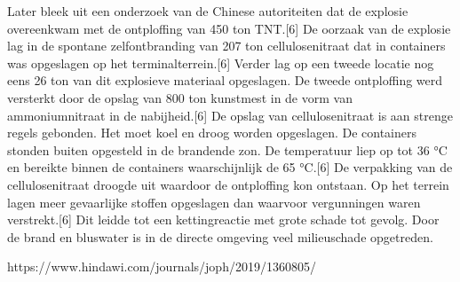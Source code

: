 {{{{{{Later bleek uit een onderzoek van de Chinese autoriteiten dat de explosie overeenkwam met de ontploffing van 450 ton TNT.[6] 
De oorzaak van de explosie lag in de spontane zelfontbranding van 207 ton cellulosenitraat dat in containers was opgeslagen op het terminalterrein.[6] 
Verder lag op een tweede locatie nog eens 26 ton van dit explosieve materiaal opgeslagen.
De tweede ontploffing werd versterkt door de opslag van 800 ton kunstmest in de vorm van ammoniumnitraat in de nabijheid.[6]
De opslag van cellulosenitraat is aan strenge regels gebonden. Het moet koel en droog worden opgeslagen. De containers stonden buiten opgesteld in de brandende zon. De temperatuur liep op tot 36 °C en bereikte binnen de containers waarschijnlijk de 65 °C.[6] De verpakking van de cellulosenitraat droogde uit waardoor de ontploffing kon ontstaan. Op het terrein lagen meer gevaarlijke stoffen opgeslagen dan waarvoor vergunningen waren verstrekt.[6] Dit leidde tot een kettingreactie met grote schade tot gevolg. Door de brand en bluswater is in de directe omgeving veel milieuschade opgetreden.


https://www.hindawi.com/journals/joph/2019/1360805/ 
\cite{jiang16042019TanjinExplosion}

}}}}}}
